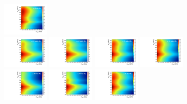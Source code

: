 \begin{figure}[htbp]
  \includegraphics[width=0.2\textwidth]{fig/analysis/template_res_e_LP_bb_HDy.pdf}\\
  \includegraphics[width=0.2\textwidth]{fig/analysis/template_res_mu_HP_nobb_HDy.pdf}
  \includegraphics[width=0.2\textwidth]{fig/analysis/template_res_e_HP_nobb_HDy.pdf}
  \includegraphics[width=0.2\textwidth]{fig/analysis/template_res_mu_LP_nobb_HDy.pdf}
  \includegraphics[width=0.2\textwidth]{fig/analysis/template_res_e_LP_nobb_HDy.pdf}\\
  \includegraphics[width=0.2\textwidth]{fig/analysis/template_res_mu_HP_vbf_HDy.pdf}
  \includegraphics[width=0.2\textwidth]{fig/analysis/template_res_e_HP_vbf_HDy.pdf}
  \includegraphics[width=0.2\textwidth]{fig/analysis/template_res_mu_LP_vbf_HDy.pdf}

\end{figure}
